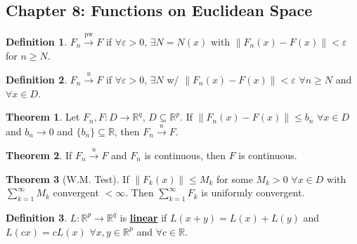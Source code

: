 \documentclass{article}
\newcommand{\R}{\mathbb{R}}
\newcommand{\define}[1]{\textbf{\underline{#1}}}
\newcommand{\func}[3]{#1: #2 \to #3}
\renewcommand{\Subset}{\subseteq}
\theoremstyle{definition}
\newtheorem*{defn}{Definition}
\newtheorem*{thm}{Theorem}
\theoremstyle{remark}
\begin{document}
    \subsection*{Chapter 8: Functions on Euclidean Space}{
        \begin{defn}
            $F_n \xrightarrow{\mathrm{pw}}F$ if $\forall \varepsilon >0$, $\exists N=N(x)$ with $\|F_n(x)-F(x)\|<\varepsilon$ for $n\geq N$.
        \end{defn}
        
        \begin{defn}
            $F_n \xrightarrow{u}F$ if $\forall \varepsilon >0$, $\exists N$ w/ $\|F_n(x)-F(x)\|<\varepsilon$ $\forall n\geq N$ and $\forall x \in D$.
        \end{defn}
        
        \begin{thm}
            Let $\func{F_n,F}{D}{\R^q}$, $D \Subset \R^p$. If $\|F_n(x)-F(x)\|\leq b_n$ $\forall x \in D$ and $b_n \xrightarrow{}0$ and $\{b_n\} \Subset \R$, then $F_n\xrightarrow{u}F$.
        \end{thm}
        
        \begin{thm}
            If $F_n \xrightarrow{u}F$ and $F_n$ is continuous, then $F$ is  continuous.
        \end{thm}
        
        \begin{thm}[W.M. Test]
            If $\|F_k(x)\| \leq M_k$ for some $M_k > 0$ $\forall x \in D$ with $\sum_{k=1}^\infty M_k$ convergent $< \infty$. Then $\sum_{k=1}^\infty F_k$ is uniformly convergent.
        \end{thm}
        
        \begin{defn}
            $\func{L}{\R^p}{\R^q}$ is \define{linear} if $L(x+y)=L(x)+L(y)$ and $L(cx)=cL(x)$ $\forall x,y \in \R^p$ and $\forall c \in \R$.
        \end{defn}
    }
\end{document}
